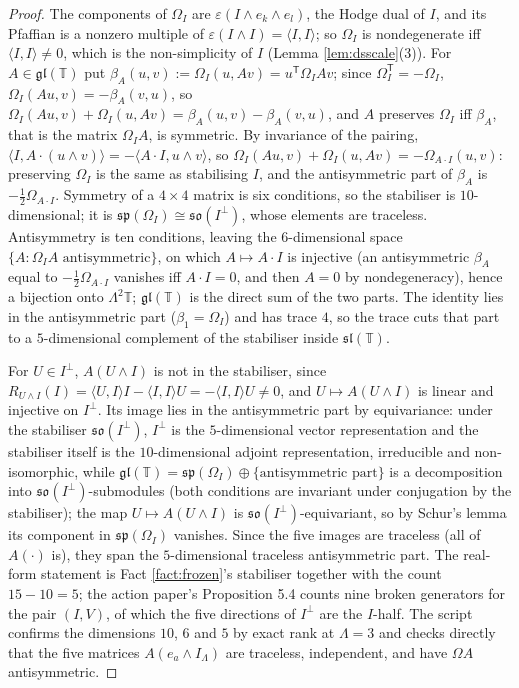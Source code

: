 \documentclass[11pt]{article}
\theoremstyle{definition}
\newcommand{\T}{\mathbb{T}}
\newcommand{\ip}[2]{\langle #1, #2\rangle}
\begin{document}
\begin{proof}
The components of $\Omega_{I}$ are $\varepsilon(I\wedge e_{k}\wedge e_{l})$, the Hodge dual of $I$, and its Pfaffian is a nonzero multiple of $\varepsilon(I\wedge I) = \ip{I}{I}$; so $\Omega_{I}$ is nondegenerate iff $\ip{I}{I} \neq 0$, which is the non-simplicity of $I$ (Lemma \ref{lem:dsscale}(3)). For $A \in \mathfrak{gl}(\T)$ put $\beta_{A}(u,v) := \Omega_{I}(u, Av) = u^{\mathsf T}\Omega_{I}Av$; since $\Omega_{I}^{\mathsf T} = -\Omega_{I}$, $\Omega_{I}(Au,v) = -\beta_{A}(v,u)$, so $\Omega_{I}(Au,v) + \Omega_{I}(u,Av) = \beta_{A}(u,v) - \beta_{A}(v,u)$, and $A$ preserves $\Omega_{I}$ iff $\beta_{A}$, that is the matrix $\Omega_{I}A$, is symmetric. By invariance of the pairing, $\ip{I}{A\cdot(u\wedge v)} = -\ip{A\cdot I}{u\wedge v}$, so $\Omega_{I}(Au,v) + \Omega_{I}(u,Av) = -\Omega_{A\cdot I}(u,v)$: preserving $\Omega_{I}$ is the same as stabilising $I$, and the antisymmetric part of $\beta_{A}$ is $-\tfrac12\Omega_{A\cdot I}$. Symmetry of a $4\times 4$ matrix is six conditions, so the stabiliser is $10$-dimensional; it is $\mathfrak{sp}(\Omega_{I}) \cong \mathfrak{so}(I^{\perp})$, whose elements are traceless. Antisymmetry is ten conditions, leaving the $6$-dimensional space $\{A : \Omega_{I}A \text{ antisymmetric}\}$, on which $A \mapsto A\cdot I$ is injective (an antisymmetric $\beta_{A}$ equal to $-\tfrac12\Omega_{A\cdot I}$ vanishes iff $A\cdot I = 0$, and then $A = 0$ by nondegeneracy), hence a bijection onto $\Lambda^{2}\T$; $\mathfrak{gl}(\T)$ is the direct sum of the two parts. The identity lies in the antisymmetric part ($\beta_{1} = \Omega_{I}$) and has trace $4$, so the trace cuts that part to a $5$-dimensional complement of the stabiliser inside $\mathfrak{sl}(\T)$.

For $U \in I^{\perp}$, $A(U\wedge I)$ is not in the stabiliser, since $R_{U\wedge I}(I) = \ip{U}{I}I - \ip{I}{I}U = -\ip{I}{I}U \neq 0$, and $U \mapsto A(U\wedge I)$ is linear and injective on $I^{\perp}$. Its image lies in the antisymmetric part by equivariance: under the stabiliser $\mathfrak{so}(I^{\perp})$, $I^{\perp}$ is the $5$-dimensional vector representation and the stabiliser itself is the $10$-dimensional adjoint representation, irreducible and non-isomorphic, while $\mathfrak{gl}(\T) = \mathfrak{sp}(\Omega_{I}) \oplus \{\text{antisymmetric part}\}$ is a decomposition into $\mathfrak{so}(I^{\perp})$-submodules (both conditions are invariant under conjugation by the stabiliser); the map $U \mapsto A(U\wedge I)$ is $\mathfrak{so}(I^{\perp})$-equivariant, so by Schur's lemma its component in $\mathfrak{sp}(\Omega_{I})$ vanishes. Since the five images are traceless (all of $A(\cdot)$ is), they span the $5$-dimensional traceless antisymmetric part. The real-form statement is Fact \ref{fact:frozen}'s stabiliser together with the count $15 - 10 = 5$; the action paper's Proposition 5.4 counts nine broken generators for the pair $(I, V)$, of which the five directions of $I^{\perp}$ are the $I$-half. The script confirms the dimensions $10$, $6$ and $5$ by exact rank at $\Lambda = 3$ and checks directly that the five matrices $A(e_{a}\wedge I_{\Lambda})$ are traceless, independent, and have $\Omega A$ antisymmetric.
\end{proof}
\end{document}
